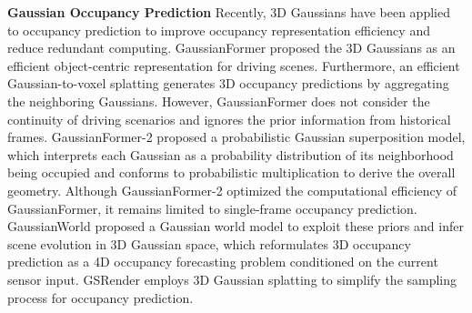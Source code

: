 \documentclass[journal]{IEEEtran}
\begin{document}
\noindent
\textbf{Gaussian Occupancy Prediction}
Recently, 3D Gaussians have been applied to occupancy prediction to improve occupancy representation efficiency and reduce redundant computing.
GaussianFormer \cite{huang2024gaussianformer} proposed the 3D Gaussians as an efficient object-centric representation for driving scenes.
Furthermore, an efficient Gaussian-to-voxel splatting generates 3D occupancy predictions by aggregating the neighboring Gaussians.
However, GaussianFormer does not consider the continuity of driving scenarios and ignores the prior information from historical frames.
GaussianFormer-2 \cite{huang2025gaussianformer} proposed a probabilistic Gaussian superposition model, which interprets each Gaussian as a probability distribution of its neighborhood being occupied and conforms to probabilistic multiplication to derive the overall geometry.
Although GaussianFormer-2 optimized the computational efficiency of GaussianFormer, it remains limited to single-frame occupancy prediction.
GaussianWorld \cite{zuo2024gaussianworld,feng2025gaussian} proposed a Gaussian world model to exploit these priors and infer scene evolution in 3D Gaussian space, which reformulates 3D occupancy prediction as a 4D occupancy forecasting problem conditioned on the current sensor input.
GSRender \cite{sun2024gsrender} employs 3D Gaussian splatting to simplify the sampling process for occupancy prediction.
\end{document}
